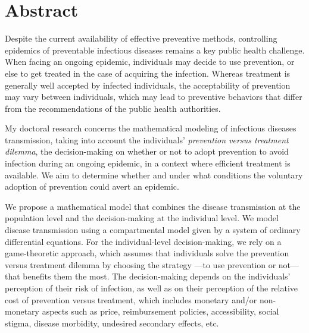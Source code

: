 
\chapter*{\centering \Large \vspace{-3cm}
		Abstract
		\vspace{-0.5cm}}

\small

Despite the current availability of effective preventive methods, controlling epidemics of preventable infectious diseases remains a key public health challenge. When facing an ongoing epidemic, individuals may decide to use prevention, or else to get treated in the case of acquiring the infection. Whereas treatment is generally well accepted by infected individuals, the acceptability of prevention may vary between individuals, which may lead to preventive behaviors that differ from the recommendations of the public health authorities. 

My doctoral research concerns the mathematical modeling of infectious diseases transmission, taking into account the individuals' {\it prevention versus treatment dilemma}, the decision-making on whether or not to adopt prevention to avoid infection during an ongoing epidemic, in a context where efficient treatment is available. We aim to determine whether and under what conditions the voluntary adoption of prevention could avert an epidemic. 


We propose a mathematical model that combines the disease transmission at the population level and the decision-making at the individual level. We model disease transmission using a compartmental model given by a system of ordinary differential equations. For the individual-level decision-making, we rely on a game-theoretic approach, which assumes that individuals solve the prevention versus treatment dilemma by choosing the strategy ---to use prevention or not--- that benefits them the most. The decision-making depends on the individuals' perception of their risk of infection, as well as on their perception of the relative cost of prevention versus treatment, which includes monetary and/or non-monetary aspects such as price, reimbursement policies, accessibility, social stigma, disease morbidity, undesired secondary effects, etc. 

